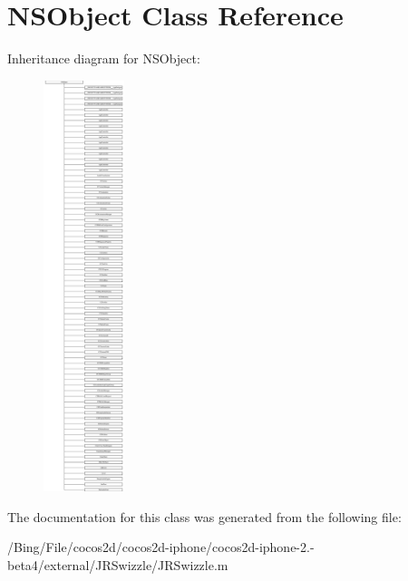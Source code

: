 \hypertarget{class_n_s_object}{\section{N\-S\-Object Class Reference}
\label{class_n_s_object}
}
Inheritance diagram for N\-S\-Object\-:\begin{figure}[H]
\begin{center}
\leavevmode
\includegraphics[height=12.000000cm]{class_n_s_object}
\end{center}
\end{figure}


The documentation for this class was generated from the following file\-:\begin{DoxyCompactItemize}
\item 
/\-Bing/\-File/cocos2d/cocos2d-\/iphone/cocos2d-\/iphone-\/2.-\/beta4/external/\-J\-R\-Swizzle/J\-R\-Swizzle.\-m\end{DoxyCompactItemize}
